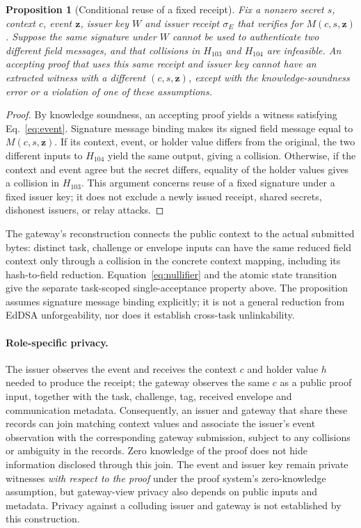 \documentclass[pdflatex,iicol,sn-mathphys-num]{sn-jnl}
\newtheorem{proposition}{Proposition}
\begin{document}
\begin{proposition}[Conditional reuse of a fixed receipt]\label{prop:receipt-binding}
Fix a nonzero secret $s$, context $c$, event $\boldsymbol z$, issuer key $W$ and issuer receipt $\sigma_E$ that verifies for $M(c,s,\boldsymbol z)$. Suppose the same signature under $W$ cannot be used to authenticate two different field messages, and that collisions in $H_{103}$ and $H_{104}$ are infeasible. An accepting proof that uses this same receipt and issuer key cannot have an extracted witness with a different $(c,s,\boldsymbol z)$, except with the knowledge-soundness error or a violation of one of these assumptions.
\end{proposition}
\begin{proof}
By knowledge soundness, an accepting proof yields a witness satisfying Eq.~\eqref{eq:event}. Signature message binding makes its signed field message equal to $M(c,s,\boldsymbol z)$. If its context, event, or holder value differs from the original, the two different inputs to $H_{104}$ yield the same output, giving a collision. Otherwise, if the context and event agree but the secret differs, equality of the holder values gives a collision in $H_{103}$. This argument concerns reuse of a fixed signature under a fixed issuer key; it does not exclude a newly issued receipt, shared secrets, dishonest issuers, or relay attacks.
\end{proof}

The gateway's reconstruction connects the public context to the actual submitted bytes: distinct task, challenge or envelope inputs can have the same reduced field context only through a collision in the concrete context mapping, including its hash-to-field reduction. Equation~\eqref{eq:nullifier} and the atomic state transition give the separate task-scoped single-acceptance property above. The proposition assumes signature message binding explicitly; it is not a general reduction from EdDSA unforgeability, nor does it establish cross-task unlinkability.

\paragraph{Role-specific privacy.} The issuer observes the event and receives the context $c$ and holder value $h$ needed to produce the receipt; the gateway observes the same $c$ as a public proof input, together with the task, challenge, tag, received envelope and communication metadata. Consequently, an issuer and gateway that share these records can join matching context values and associate the issuer's event observation with the corresponding gateway submission, subject to any collisions or ambiguity in the records. Zero knowledge of the proof does not hide information disclosed through this join. The event and issuer key remain private witnesses \emph{with respect to the proof} under the proof system's zero-knowledge assumption, but gateway-view privacy also depends on public inputs and metadata. Privacy against a colluding issuer and gateway is not established by this construction.
\end{document}

